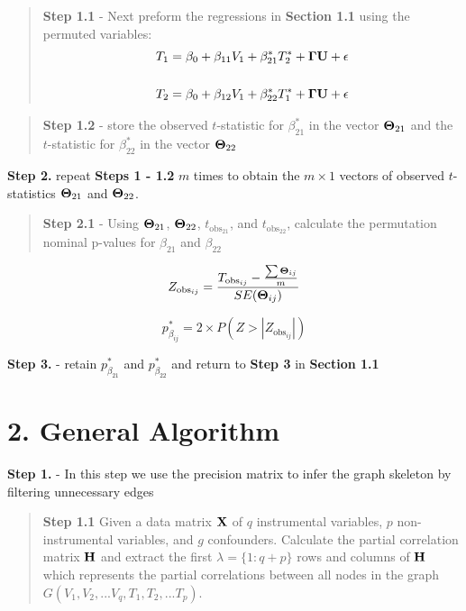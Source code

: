 \documentclass[12pt]{report}
\begin{document}
\begin{quote}
\textbf{Step 1.1} - Next preform the regressions in \textbf{Section 1.1} using the permuted variables:
\begin{eqnarray}
T_1 = \beta_0 +\beta_{11}V_1+\beta_{21}^{\ast}T_2^{\ast}+{\bf \Gamma U}+ \epsilon \\
\nonumber\\
T_2 = \beta_0 +\beta_{12}V_1+\beta_{22}^{\ast}T_1^{\ast}+{\bf \Gamma U}+ \epsilon 
\end{eqnarray}
\end{quote}

\begin{quote}
\textbf{Step 1.2} - store the observed $t$-statistic for $\beta_{21}^{\ast}$ in the vector ${\bf \Theta}_{21}$ and the $t$-statistic for $\beta_{22}^{\ast}$ in the vector ${\bf \Theta}_{22}$
\end{quote}

\noindent \textbf{Step 2.} repeat \textbf{Steps 1 - 1.2} $m$ times to obtain the $m \times 1$ vectors of observed $t$-statistics ${\bf \Theta}_{21}$ and ${\bf \Theta}_{22}$. \\

\begin{quote}
\textbf{Step 2.1} - Using ${\bf \Theta}_{21}$, ${\bf \Theta}_{22}$, $t_{\text{obs}_{21}}$, and $t_{\text{obs}_{22}}$, calculate the permutation nominal p-values for $\beta_{21}$ and $\beta_{22}$
\end{quote}

\[ Z_{\text{obs}_{ij}} = \frac{T_{\text{obs}_{ij}} - \frac{\sum {\bf \Theta}_{ij}}{m} }{SE({\bf \Theta}_{ij})} \]

\[ p^{\ast}_{\beta_{ij}} = 2\times P(Z >  |Z_{\text{obs}_{ij}}|) \]


\noindent \textbf{Step 3.} - retain $p_{\beta_{21}}^{\ast}$ and $p_{\beta_{22}}^{\ast}$ and return to \textbf{Step 3} in \textbf{Section 1.1} \\


\section*{2. General Algorithm}
\textbf{Step 1.} - In this step we use the precision matrix to infer the graph skeleton by filtering unnecessary edges 
\begin{quote}
 \textbf{Step 1.1} Given a data matrix ${\bf X}$ of $q$ instrumental variables, $p$ non-instrumental variables, and $g$ confounders. Calculate the partial correlation matrix $\bf H$ and extract the first $\lambda = \{1 : q+p\}$ rows and columns of ${\bf H}$ which represents the partial correlations between all nodes in the graph $G(V_1, V_2,...V_q, T_1, T_2, ... T_p)$.
\end{quote}
\end{document}
